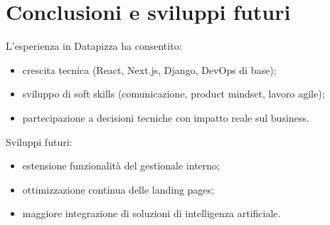 \chapter{Conclusioni e sviluppi futuri}
L'esperienza in Datapizza ha consentito:
\begin{itemize}
  \item crescita tecnica (React, Next.js, Django, DevOps di base);
  \item sviluppo di soft skills (comunicazione, product mindset, lavoro agile);
  \item partecipazione a decisioni tecniche con impatto reale sul business.
\end{itemize}

Sviluppi futuri:
\begin{itemize}
  \item estensione funzionalità del gestionale interno;
  \item ottimizzazione continua delle landing pages;
  \item maggiore integrazione di soluzioni di intelligenza artificiale.
\end{itemize}